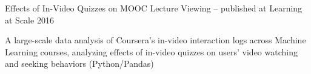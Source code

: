 \documentclass[margin,line]{resume}
\begin{document}
\begin{resume}
\vspace{-2mm}

Effects of In-Video Quizzes on MOOC Lecture Viewing -- published at Learning at Scale 2016
\begin{compactitem}
\item A large-scale data analysis of Coursera's in-video interaction logs across Machine Learning courses, analyzing effects of in-video quizzes on users' video watching and seeking behaviors (Python/Pandas)
\end{compactitem}



\end{resume}
\end{document}
